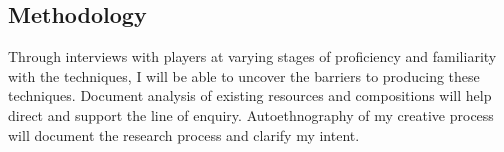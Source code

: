 
\subsection{Methodology}
Through interviews with players at varying stages of proficiency and familiarity with the techniques, I will be able to uncover the barriers to producing these techniques. 
Document analysis of existing resources and compositions will help direct and support the line of enquiry. 
Autoethnography of my creative process will document the research process and clarify my intent.  
